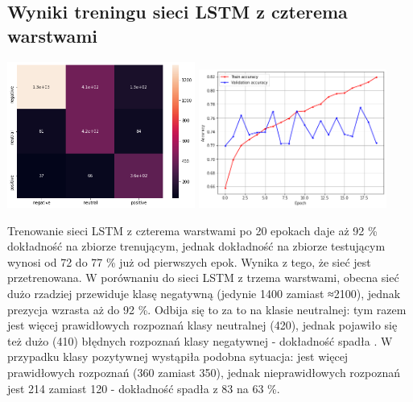 \documentclass[11pt, a4paper, notitlepage]{report}
\begin{document}
\subsection{Wyniki treningu sieci LSTM z czterema warstwami}
\begin{center}
\includegraphics[width=175pt]{graphics/heatmap_LSTM_4_10_slow.png}
\includegraphics[width=175pt]{graphics/accuracy_LSTM_4_10_slow.png}
\end{center}
Trenowanie sieci LSTM z czterema warstwami po 20 epokach daje aż 92 \% dokładność na zbiorze trenującym, jednak dokładność na zbiorze testującym wynosi od 72 do 77 \% już od pierwszych epok. Wynika z tego, że sieć jest przetrenowana. W porównaniu do sieci LSTM z trzema warstwami, obecna sieć dużo rzadziej przewiduje klasę negatywną (jedynie 1400 zamiast ≈2100), jednak prezycja wzrasta aż do 92 \%. Odbija się to za to na klasie neutralnej: tym razem jest więcej prawidłowych rozpoznań klasy neutralnej (420), jednak pojawiło się też dużo (410) błędnych rozpoznań klasy negatywnej - dokładność spadła . W przypadku klasy pozytywnej wystąpiła podobna sytuacja: jest więcej prawidłowych rozpoznań (360 zamiast 350), jednak nieprawidłowych rozpoznań jest 214 zamiast 120 - dokładność spadła z 83 na 63 \%.
\end{document}
